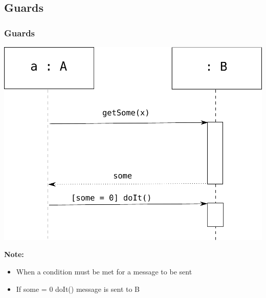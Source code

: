 \documentclass{beamer}
\begin{document}
\subsection{Guards}
\begin{frame}
	\frametitle{Guards}
	\begin{center}
		\includegraphics[scale=0.35]{guards}
	\end{center}
	\textbf{Note:}
	\begin{itemize}
  			\item When a condition must be met for a message to be sent
  			\item If some = 0 doIt() message is sent to B
	\end{itemize}
\end{frame}
\end{document}
